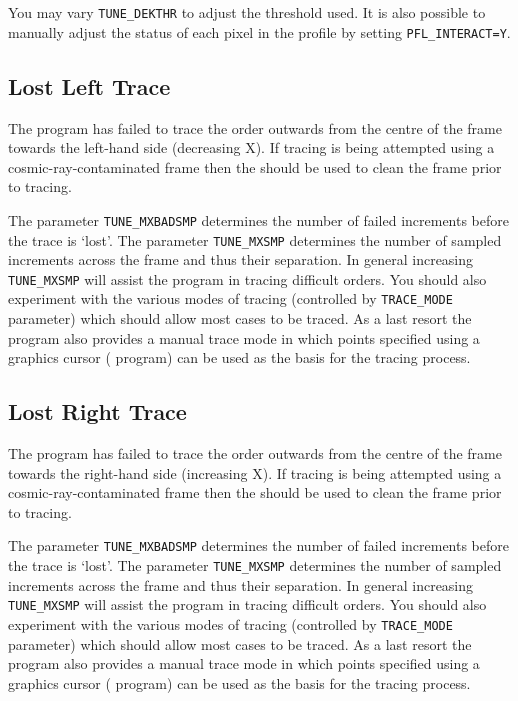 You may vary \verb+TUNE_DEKTHR+ to adjust the threshold used.
It is also possible to manually adjust the status of each pixel in the
profile by setting \verb+PFL_INTERACT=Y+\@.


\subsection{ Lost Left Trace}

The program has failed to trace the order outwards from the centre of
the frame towards the left-hand side (decreasing X). If tracing is being
attempted using a cosmic-ray-contaminated frame then the
should be used to clean the frame prior to tracing.

The parameter \verb+TUNE_MXBADSMP+ determines the number of failed
increments before the trace is `lost'.  The parameter \verb+TUNE_MXSMP+
determines the number of sampled increments across the frame and thus
their separation. In general increasing \verb+TUNE_MXSMP+ will assist the
program in tracing difficult orders.  You should also experiment
with the various modes of tracing (controlled by \verb+TRACE_MODE+ parameter)
which should allow most cases to be traced. As a last resort the program
also provides a manual trace mode in which points specified using a
graphics cursor ( program) can be used as the basis
for the tracing process.


\subsection{ Lost Right Trace}

The program has failed to trace the order outwards from the centre of
the frame towards the right-hand side (increasing X). If tracing is
being attempted using a cosmic-ray-contaminated frame then the
should be used to clean the frame prior to tracing.

The parameter \verb+TUNE_MXBADSMP+ determines the number of failed
increments before the trace is `lost'. The parameter \verb+TUNE_MXSMP+
determines the number of sampled increments across the frame and thus
their separation. In general increasing \verb+TUNE_MXSMP+ will assist the
program in tracing difficult orders.  You should also experiment
with the various modes of tracing (controlled by \verb+TRACE_MODE+ parameter)
which should allow most cases to be traced. As a last resort the program
also provides a manual trace mode in which points specified using a
graphics cursor ( program) can be used as the basis
for the tracing process.


